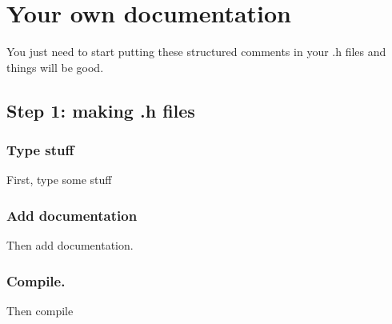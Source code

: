 \hypertarget{own}{}\section{Your own documentation}\label{own}


You just need to start putting these structured comments in your .h files and things will be good.

\hypertarget{own_1}{}\subsection{Step 1: making .h files}\label{own_1}


\hypertarget{own_1_1}{}\subsubsection{Type stuff}\label{own_1_1}


First, type some stuff

\hypertarget{own_1_2}{}\subsubsection{Add documentation}\label{own_1_2}


Then add documentation.

\hypertarget{own_1_3}{}\subsubsection{Compile.}\label{own_1_3}


Then compile

